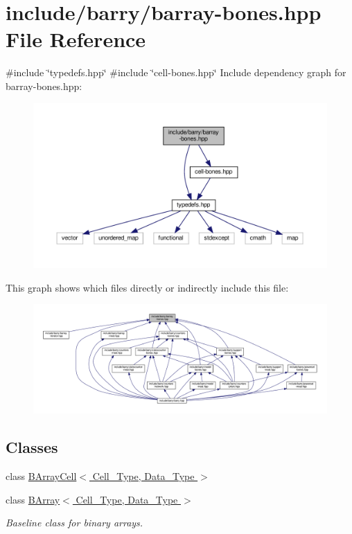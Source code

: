 \hypertarget{barray-bones_8hpp}{}\section{include/barry/barray-\/bones.hpp File Reference}
\label{barray-bones_8hpp}
{\ttfamily \#include \char`\"{}typedefs.\+hpp\char`\"{}}\newline
{\ttfamily \#include \char`\"{}cell-\/bones.\+hpp\char`\"{}}\newline
Include dependency graph for barray-\/bones.hpp\+:\nopagebreak
\begin{figure}[H]
\begin{center}
\leavevmode
\includegraphics[width=350pt]{barray-bones_8hpp__incl}
\end{center}
\end{figure}
This graph shows which files directly or indirectly include this file\+:\nopagebreak
\begin{figure}[H]
\begin{center}
\leavevmode
\includegraphics[width=350pt]{barray-bones_8hpp__dep__incl}
\end{center}
\end{figure}
\subsection*{Classes}
\begin{DoxyCompactItemize}
\item 
class \hyperlink{class_b_array_cell}{B\+Array\+Cell$<$ Cell\+\_\+\+Type, Data\+\_\+\+Type $>$}
\item 
class \hyperlink{class_b_array}{B\+Array$<$ Cell\+\_\+\+Type, Data\+\_\+\+Type $>$}
\begin{DoxyCompactList}\small\item\em Baseline class for binary arrays. \end{DoxyCompactList}\end{DoxyCompactItemize}
